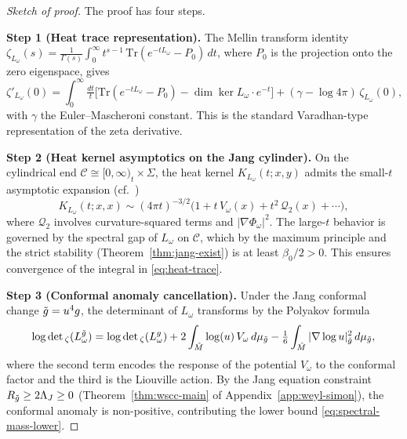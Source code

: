 \begin{proof}[Sketch of proof]
The proof has four steps.

\textbf{Step 1 (Heat trace representation).} The Mellin transform identity $\zeta_{L_\omega}(s) = \tfrac{1}{\Gamma(s)}\int_0^\infty t^{s-1}\,\mathrm{Tr}(e^{-tL_\omega} - P_0)\,dt$, where $P_0$ is the projection onto the zero eigenspace, gives
\begin{equation}\label{eq:heat-trace}
\zeta'_{L_\omega}(0) = \int_0^\infty \tfrac{dt}{t}\bigl[\mathrm{Tr}(e^{-tL_\omega}-P_0) - \dim\ker L_\omega \cdot e^{-t}\bigr] + (\gamma - \log 4\pi)\,\zeta_{L_\omega}(0),
\end{equation}
with $\gamma$ the Euler--Mascheroni constant. This is the standard Varadhan-type representation of the zeta derivative.

\textbf{Step 2 (Heat kernel asymptotics on the Jang cylinder).} On the cylindrical end $\mathcal{C}\cong[0,\infty)_t\times\Sigma$, the heat kernel $K_{L_\omega}(t;x,y)$ admits the small-$t$ asymptotic expansion (cf.\ \cite{gilkey2004, vassilevich2003})
\begin{equation}\label{eq:heat-asymptotic}
K_{L_\omega}(t;x,x) \sim (4\pi t)^{-3/2}\bigl(1 + t\,V_\omega(x) + t^2\,\mathcal{Q}_2(x) + \cdots\bigr),
\end{equation}
where $\mathcal{Q}_2$ involves curvature-squared terms and $|\nabla\Phi_\omega|^2$. The large-$t$ behavior is governed by the spectral gap of $L_\omega$ on $\mathcal{C}$, which by the maximum principle and the strict stability (Theorem~\ref{thm:jang-exist}) is at least $\beta_0/2>0$. This ensures convergence of the integral in \eqref{eq:heat-trace}.

\textbf{Step 3 (Conformal anomaly cancellation).} Under the Jang conformal change $\tilde{g} = u^4 g$, the determinant of $L_\omega$ transforms by the Polyakov formula
\begin{equation}\label{eq:polyakov}
\log\det{}_\zeta(L_\omega^{\tilde{g}}) = \log\det{}_\zeta(L_\omega^{g}) + 2\int_{\tilde{M}}\log(u)\,V_\omega\,d\mu_{\tilde{g}} - \tfrac{1}{6}\int_{\tilde{M}}|\nabla\log u|^2_{\tilde{g}}\,d\mu_{\tilde{g}},
\end{equation}
where the second term encodes the response of the potential $V_\omega$ to the conformal factor and the third is the Liouville action. By the Jang equation constraint $R_{\tilde{g}} \geq 2\Lambda_J \geq 0$ (Theorem~\ref{thm:wscc-main} of Appendix~\ref{app:weyl-simon}), the conformal anomaly is non-positive, contributing the lower bound \eqref{eq:spectral-mass-lower}.


\end{proof}
